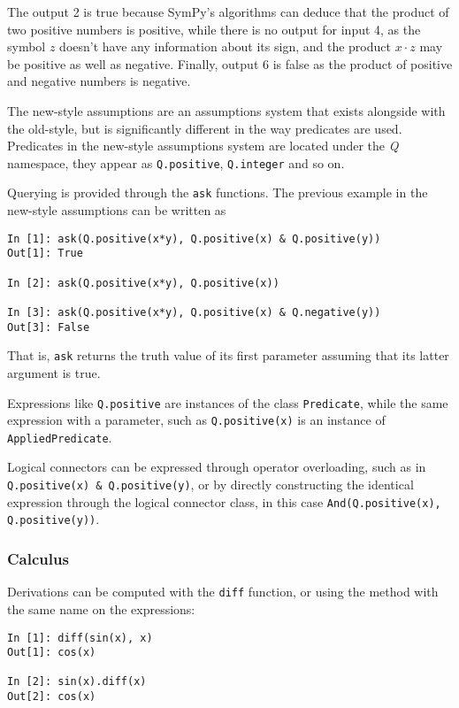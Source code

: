 The output 2 is true because SymPy's algorithms can deduce that the product of
two positive numbers is positive, while there is no output for input 4, as the
symbol $z$ doesn't have any information about its sign, and the product
$x\cdot z$ may be positive as well as negative.
Finally, output 6 is false as the product of positive and negative numbers is
negative.

The new-style assumptions are an assumptions system that exists alongside with
the old-style, but is significantly different in the way predicates are
used.
Predicates in the new-style assumptions system are located under the \textit{Q}
namespace, they appear as
\verb|Q.positive|, \verb|Q.integer| and so on.

Querying is provided through the \verb|ask| functions.
The previous example in the new-style assumptions can be written as
\begin{verbatim}
In [1]: ask(Q.positive(x*y), Q.positive(x) & Q.positive(y))
Out[1]: True

In [2]: ask(Q.positive(x*y), Q.positive(x))

In [3]: ask(Q.positive(x*y), Q.positive(x) & Q.negative(y))
Out[3]: False
\end{verbatim}
%
That is, \verb|ask| returns the truth value of its first parameter assuming
that its latter argument is true.

Expressions like \verb|Q.positive| are instances of the class \verb|Predicate|,
while the same expression with a parameter, such as \verb|Q.positive(x)| is an
instance of \verb|AppliedPredicate|.

Logical connectors can be expressed through operator overloading,
such as in \verb|Q.positive(x) & Q.positive(y)|,
or by directly constructing the identical expression through the 
logical connector class, in this case \verb|And(Q.positive(x), Q.positive(y))|.


\subsubsection{Calculus}


Derivations can be computed with the \verb|diff| function,
or using the method with the same name on the expressions:

\begin{verbatim}
In [1]: diff(sin(x), x)
Out[1]: cos(x)

In [2]: sin(x).diff(x)
Out[2]: cos(x)
\end{verbatim}

